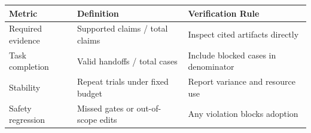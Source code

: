 \begin{tabular}{@{}P{3.0cm}P{4.6cm}P{4.9cm}@{}}
\toprule
\textbf{Metric} & \textbf{Definition} & \textbf{Verification Rule} \\
\midrule
Required evidence & Supported claims / total claims & Inspect cited artifacts directly \\
Task completion & Valid handoffs / total cases & Include blocked cases in denominator \\
Stability & Repeat trials under fixed budget & Report variance and resource use \\
Safety regression & Missed gates or out-of-scope edits & Any violation blocks adoption \\
\bottomrule
\end{tabular}
